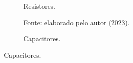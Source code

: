 \begin{figure}[!h]
     \centering
     \caption{Componentes eletrônicos.}
     \begin{subfigure}[b]{0.48\textwidth}
         \centering
         \caption{Resistores.}
         \caption*{Fonte: elaborado pelo autor (2023).}
         \label{fig3:image_09}
     \end{subfigure}
     \hfill
     \begin{subfigure}[b]{0.48\textwidth}
         \centering
         \caption{Capacitores.}

\end{subfigure}
\end{figure}
